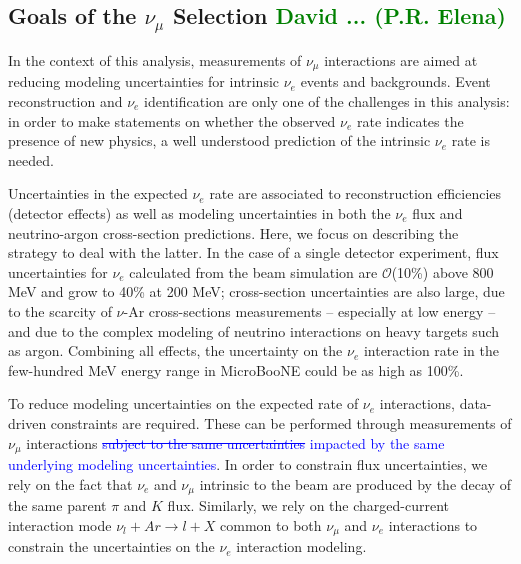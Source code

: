 \documentclass[a4paper]{article}
\begin{document}
\subsection{Goals of the $\nu_{\mu}$ Selection \textcolor{green}{David   ... (P.R. Elena)}}
\label{ssec:goalsofnumusel}

\par In the context of this analysis, measurements of $\nu_{\mu}$ interactions are aimed at reducing modeling uncertainties for intrinsic $\nu_e$ events and backgrounds. Event reconstruction and $\nu_e$ identification are only one of the challenges in this analysis:  in order to make statements on whether the observed $\nu_e$ rate indicates the presence of new physics, a well understood prediction of the intrinsic $\nu_e$ rate is needed. 

\par Uncertainties in the expected $\nu_e$ rate are associated to reconstruction efficiencies (detector effects) as well as modeling uncertainties in both the $\nu_e$ flux  and neutrino-argon cross-section predictions. Here, we focus on describing the strategy to deal with the latter. In the case of a single detector experiment, %
flux uncertainties for $\nu_e$ calculated from the beam simulation are $\mathcal{O}$(10\%) above 800 MeV and grow to 40\% at 200 MeV;  cross-section uncertainties are also large, due to the scarcity of $\nu$-Ar cross-sections measurements -- especially at low energy -- and due to the complex modeling of neutrino interactions on heavy targets such as argon. Combining all effects, the uncertainty on the $\nu_e$ interaction rate in the few-hundred MeV energy range in MicroBooNE could be as high as 100\%.
\par To reduce modeling uncertainties on the expected rate of $\nu_e$ interactions, data-driven constraints are required. These can be performed through measurements of $\nu_{\mu}$ interactions \textcolor{blue}{\st{subject to the same uncertainties} impacted by the same underlying modeling uncertainties}. In order to constrain flux uncertainties, we rely on the fact that $\nu_e$ and $\nu_{\mu}$ intrinsic to the beam are produced by the decay of the same parent $\pi$ and $K$ flux. Similarly, we rely on the charged-current interaction mode $\nu_{l} + Ar \rightarrow l + X$ common to both $\nu_{\mu}$ and $\nu_e$ interactions to constrain the uncertainties on the $\nu_e$ interaction modeling.
\end{document}
